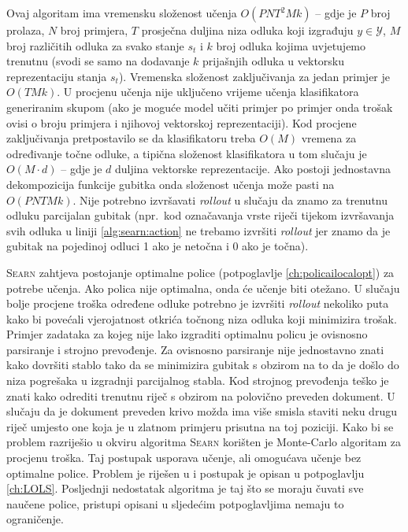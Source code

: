 Ovaj algoritam ima vremensku složenost učenja $O(P N T^2 M k)$ -- gdje je $P$
broj prolaza, $N$ broj primjera, $T$ prosječna duljina niza odluka koji
izgrađuju $y \in \mathcal{Y}$, $M$ broj različitih odluka za svako stanje $s_t$
i $k$ broj odluka kojima uvjetujemo trenutnu (svodi se samo na dodavanje $k$
prijašnjih odluka u vektorsku reprezentaciju stanja $s_t$). Vremenska složenost
zaključivanja za jedan primjer je $O(T M k)$. U procjenu učenja nije uključeno
vrijeme učenja klasifikatora generiranim skupom (ako je moguće model učiti
primjer po primjer  onda trošak ovisi o broju primjera i njihovoj
vektorskoj reprezentaciji). Kod procjene zaključivanja pretpostavilo se da
klasifikatoru treba $O(M)$ vremena za određivanje točne odluke, a tipična
složenost klasifikatora u tom slučaju je $O(M \cdot d)$ -- gdje je $d$ duljina
vektorske reprezentacije. Ako postoji jednostavna dekompozicija funkcije gubitka
onda složenost učenja može pasti na $O(P N T M k)$. Nije potrebno izvršavati
\textit{rollout} u slučaju da znamo za trenutnu odluku parcijalan gubitak
(npr.~kod označavanja vrste riječi tijekom izvršavanja svih odluka u liniji
\ref{alg:searn:action} ne trebamo izvršiti \textit{rollout} jer znamo da je
gubitak na pojedinoj odluci 1 ako je netočna i 0 ako je točna).

\textsc{Searn} zahtjeva postojanje optimalne police (potpoglavlje
\ref{ch:policailocalopt}) za potrebe učenja. Ako polica nije optimalna, onda će
učenje biti otežano. U slučaju bolje procjene troška određene odluke potrebno je
izvršiti \textit{rollout} nekoliko puta kako bi povećali vjerojatnost otkrića
točnong niza odluka koji minimizira trošak. Primjer zadataka za kojeg nije lako
izgraditi optimalnu policu je ovisnosno parsiranje i strojno prevođenje. Za
ovisnosno parsiranje nije jednostavno znati kako dovršiti stablo tako da se
minimizira gubitak s obzirom na to da je došlo do niza pogrešaka u izgradnji
parcijalnog stabla. Kod strojnog prevođenja teško je znati kako odrediti
trenutnu riječ s obzirom na polovično preveden dokument. U slučaju da je
dokument preveden krivo možda ima više smisla staviti neku drugu riječ umjesto
one koja je u zlatnom primjeru prisutna na toj poziciji. Kako bi se problem
razriješio u okviru algoritma \textsc{Searn} korišten je Monte-Carlo algoritam
za procjenu troška. Taj postupak usporava učenje, ali omogućava učenje bez
optimalne police. Problem je riješen u \citep{daume15lols} i postupak je opisan
u potpoglavlju \ref{ch:LOLS}. Posljednji nedostatak algoritma je taj što se
moraju čuvati sve naučene police, pristupi opisani u sljedećim potpoglavljima
nemaju to ograničenje.

